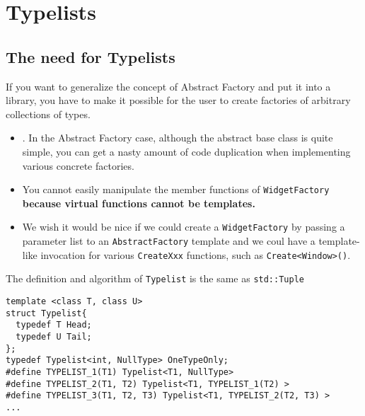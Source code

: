 
\section{Typelists}

\subsection{The need for Typelists}

If you want to generalize the concept of Abstract Factory and put it
into a library,  you have to make it possible for the user to create
factories of arbitrary collections of types.

\begin{itemize}
\item . In the Abstract Factory case, although the abstract base class
  is quite simple, you can get a nasty amount of code duplication when
  implementing various concrete factories.
\item You cannot easily manipulate the member functions of
  \texttt{WidgetFactory} \textbf{because virtual functions cannot be
    templates.}
\item We wish it would be nice if we could create a
\texttt{WidgetFactory} by passing a parameter list to an
\texttt{AbstractFactory} template and we coul have  a template-like
invocation for various \texttt{CreateXxx} functions, such as
\texttt{Create<Window>()}.
\end{itemize}

The definition and algorithm of \texttt{Typelist} is the same as
\texttt{std::Tuple}

\begin{verbatim}
template <class T, class U>
struct Typelist{
  typedef T Head;
  typedef U Tail;
};
typedef Typelist<int, NullType> OneTypeOnly;
#define TYPELIST_1(T1) Typelist<T1, NullType>
#define TYPELIST_2(T1, T2) Typelist<T1, TYPELIST_1(T2) >
#define TYPELIST_3(T1, T2, T3) Typelist<T1, TYPELIST_2(T2, T3) >
...
\end{verbatim}

